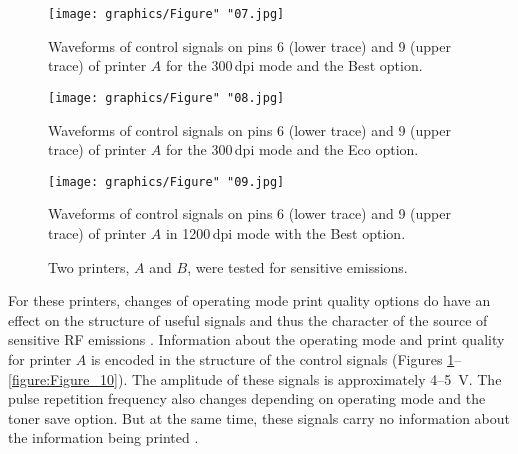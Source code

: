 \documentclass[letterpaper,journal]{ieeetran}
\begin{document}
\begin{figure*}[ht]
    \centering
    \hfill
    \caption{Waveforms of useful signals on pins 2 (lower trace) and 3 (upper
        trace) of printer $A$ for: a) the 1200\,dpi mode and the Best
        option, b) the 1200\,dpi mode and the Eco option.}
    \label{figure:Figure_06}
\end{figure*}

\begin{figure}[ht]
    \centering
    \texttt{[image: graphics/Figure" "07.jpg]}
    \caption{Waveforms of control signals on pins 6 (lower trace) and 9
        (upper trace) of printer $A$ for the 300\,dpi mode and the Best
        option.}
    \label{figure:Figure_07}
\end{figure}

\begin{figure}[ht]
    \centering
    \texttt{[image: graphics/Figure" "08.jpg]}
    \caption{Waveforms of control signals on pins 6 (lower trace) and 9
        (upper trace) of printer $A$ for the 300\,dpi mode and the Eco
        option.}
    \label{figure:Figure_08}
\end{figure}

\begin{figure}[ht]
    \centering
    \texttt{[image: graphics/Figure" "09.jpg]}
    \caption{Waveforms of control signals on pins 6 (lower trace) and 9
    (upper trace) of printer $A$ in 1200\,dpi mode with the Best option.}
    \label{figure:Figure_09}
\end{figure}

\begin{figure}[H] %
    \centering
    \hfill
    \caption{Two printers, $A$ and $B$, were tested for sensitive emissions.}
    \label{figure:Figure_02}
\end{figure}


For these printers, changes of operating mode print quality options do have
an effect on the structure of useful signals and thus the character of the
source of sensitive RF emissions \cite{Grzesiak2011a,Kubiak2015c}.
Information about the operating mode and print quality for printer $A$ is
encoded in the structure of the control signals (Figures
\ref{figure:Figure_07}--\ref{figure:Figure_10}). The amplitude of these
signals is approximately 4--\SI{5}{\volt}. The pulse repetition frequency
also changes depending on operating mode and the toner save option. But at
the same time, these signals carry no information about the information being
printed \cite{Kubiak2014c,Kuhn2004a}.
\end{document}
